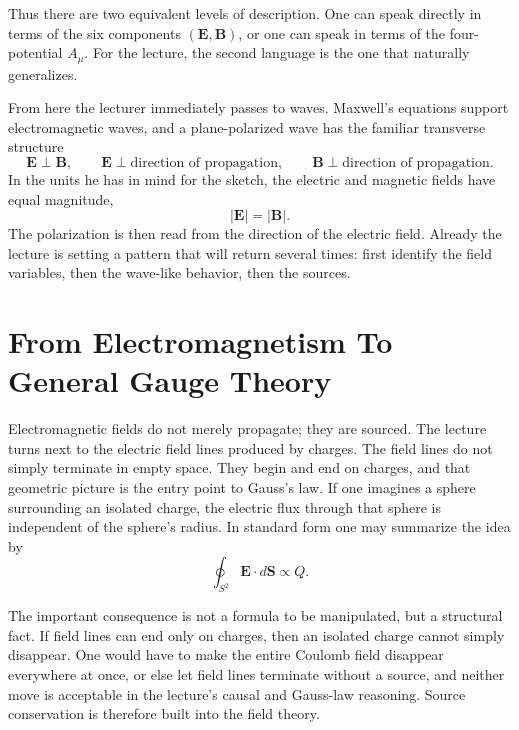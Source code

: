Thus there are two equivalent levels of description. One can speak directly in terms of the six components \((\mathbf E,\mathbf B)\), or one can speak in terms of the four-potential \(A_\mu\). For the lecture, the second language is the one that naturally generalizes.

From here the lecturer immediately passes to waves. Maxwell's equations support electromagnetic waves, and a plane-polarized wave has the familiar transverse structure
\begin{equation}
\mathbf E \perp \mathbf B,
\qquad
\mathbf E \perp \text{direction of propagation},
\qquad
\mathbf B \perp \text{direction of propagation}.
\end{equation}
In the units he has in mind for the sketch, the electric and magnetic fields have equal magnitude,
\begin{equation}
|\mathbf E| = |\mathbf B|.
\end{equation}
The polarization is then read from the direction of the electric field. Already the lecture is setting a pattern that will return several times: first identify the field variables, then the wave-like behavior, then the sources.

\section{From Electromagnetism To General Gauge Theory}

Electromagnetic fields do not merely propagate; they are sourced. The lecture turns next to the electric field lines produced by charges. The field lines do not simply terminate in empty space. They begin and end on charges, and that geometric picture is the entry point to Gauss's law. If one imagines a sphere surrounding an isolated charge, the electric flux through that sphere is independent of the sphere's radius. In standard form one may summarize the idea by
\begin{equation}
\oint_{S^2} \mathbf E\cdot d\mathbf S \propto Q.
\end{equation}

The important consequence is not a formula to be manipulated, but a structural fact. If field lines can end only on charges, then an isolated charge cannot simply disappear. One would have to make the entire Coulomb field disappear everywhere at once, or else let field lines terminate without a source, and neither move is acceptable in the lecture's causal and Gauss-law reasoning. Source conservation is therefore built into the field theory.

